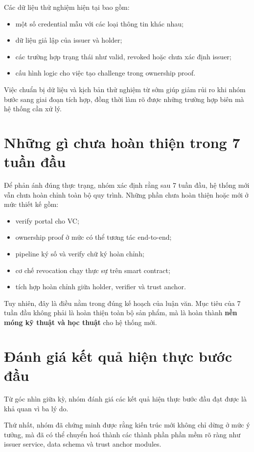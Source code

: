Các dữ liệu thử nghiệm hiện tại bao gồm:
\begin{itemize}
    \item một số credential mẫu với các loại thông tin khác nhau;
    \item dữ liệu giả lập của issuer và holder;
    \item các trường hợp trạng thái như valid, revoked hoặc chưa xác định issuer;
    \item cấu hình logic cho việc tạo challenge trong ownership proof.
\end{itemize}

Việc chuẩn bị dữ liệu và kịch bản thử nghiệm từ sớm giúp giảm rủi ro khi nhóm bước sang giai đoạn tích hợp, đồng thời làm rõ được những trường hợp biên mà hệ thống cần xử lý.

\section{Những gì chưa hoàn thiện trong 7 tuần đầu}

Để phản ánh đúng thực trạng, nhóm xác định rằng sau 7 tuần đầu, hệ thống mới vẫn chưa hoàn chỉnh toàn bộ quy trình. Những phần chưa hoàn thiện hoặc mới ở mức thiết kế gồm:
\begin{itemize}
    \item verify portal cho VC;
    \item ownership proof ở mức có thể tương tác end-to-end;
    \item pipeline ký số và verify chữ ký hoàn chỉnh;
    \item cơ chế revocation chạy thực sự trên smart contract;
    \item tích hợp hoàn chỉnh giữa holder, verifier và trust anchor.
\end{itemize}

Tuy nhiên, đây là điều nằm trong đúng kế hoạch của luận văn. Mục tiêu của 7 tuần đầu không phải là hoàn thiện toàn bộ sản phẩm, mà là hoàn thành \textbf{nền móng kỹ thuật và học thuật} cho hệ thống mới.

\section{Đánh giá kết quả hiện thực bước đầu}

Từ góc nhìn giữa kỳ, nhóm đánh giá các kết quả hiện thực bước đầu đạt được là khả quan vì ba lý do.

Thứ nhất, nhóm đã chứng minh được rằng kiến trúc mới không chỉ dừng ở mức ý tưởng, mà đã có thể chuyển hoá thành các thành phần phần mềm rõ ràng như issuer service, data schema và trust anchor modules.

